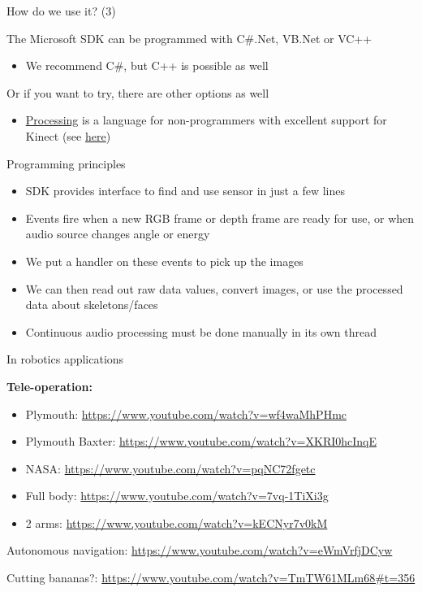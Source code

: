 \documentclass[compress]{beamer}
\begin{document}
\begin{frame}{How do we use it? (3)}

The Microsoft SDK can be programmed with C\#.Net, VB.Net or VC++

\begin{itemize}

\item
  We recommend C\#, but C++ is possible as well
\end{itemize}

Or if you want to try, there are other options as well

\begin{itemize}

\item
  \href{https://processing.org/}{Processing} is a language for
  non-programmers with excellent support for Kinect (see
  \href{http://shiffman.net/p5/kinect/}{here})
\end{itemize}

\end{frame}

\begin{frame}{Programming principles}

\begin{itemize}

\item
  SDK provides interface to find and use sensor in just a few lines
\item
  Events fire when a new RGB frame or depth frame are ready for use, or
  when audio source changes angle or energy
\item
  We put a handler on these events to pick up the images
\item
  We can then read out raw data values, convert images, or use the
  processed data about skeletons/faces
\item
  Continuous audio processing must be done manually in its own thread
\end{itemize}

\end{frame}

\begin{frame}{In robotics applications}

\textbf{Tele-operation:}

\begin{itemize}

\item
  Plymouth: \url{https://www.youtube.com/watch?v=wf4waMhPHmc}
\item
  Plymouth Baxter: \url{https://www.youtube.com/watch?v=XKRI0hcInqE}
\item
  NASA: \url{https://www.youtube.com/watch?v=pqNC72fgetc}
\item
  Full body: \url{https://www.youtube.com/watch?v=7vq-1TiXi3g}
\item
  2 arms: \url{https://www.youtube.com/watch?v=kECNyr7v0kM}
\end{itemize}

Autonomous navigation: \url{https://www.youtube.com/watch?v=eWmVrfjDCyw}

Cutting bananas?:
\url{https://www.youtube.com/watch?v=TmTW61MLm68\#t=356}

\end{frame}
\end{document}
